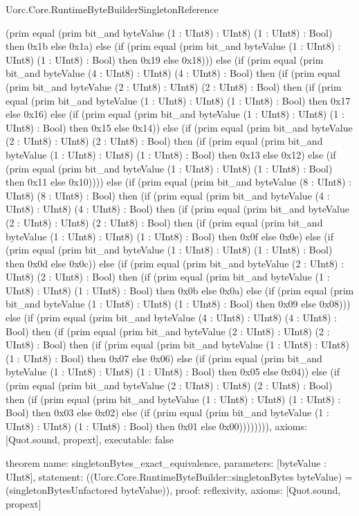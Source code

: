 \begin{lexlean}{Uorc.Core.RuntimeByteBuilderSingletonReference}
\begin{semanticmodule}
{(prim equal (prim bit_and byteValue (1 : UInt8) : UInt8) (1 : UInt8) : Bool) then 0x1b else 0x1a) else (if (prim equal (prim bit_and byteValue (1 : UInt8) : UInt8) (1 : UInt8) : Bool) then 0x19 else 0x18))) else (if (prim equal (prim bit_and byteValue (4 : UInt8) : UInt8) (4 : UInt8) : Bool) then (if (prim equal (prim bit_and byteValue (2 : UInt8) : UInt8) (2 : UInt8) : Bool) then (if (prim equal (prim bit_and byteValue (1 : UInt8) : UInt8) (1 : UInt8) : Bool) then 0x17 else 0x16) else (if (prim equal (prim bit_and byteValue (1 : UInt8) : UInt8) (1 : UInt8) : Bool) then 0x15 else 0x14)) else (if (prim equal (prim bit_and byteValue (2 : UInt8) : UInt8) (2 : UInt8) : Bool) then (if (prim equal (prim bit_and byteValue (1 : UInt8) : UInt8) (1 : UInt8) : Bool) then 0x13 else 0x12) else (if (prim equal (prim bit_and byteValue (1 : UInt8) : UInt8) (1 : UInt8) : Bool) then 0x11 else 0x10)))) else (if (prim equal (prim bit_and byteValue (8 : UInt8) : UInt8) (8 : UInt8) : Bool) then (if (prim equal (prim bit_and byteValue (4 : UInt8) : UInt8) (4 : UInt8) : Bool) then (if (prim equal (prim bit_and byteValue (2 : UInt8) : UInt8) (2 : UInt8) : Bool) then (if (prim equal (prim bit_and byteValue (1 : UInt8) : UInt8) (1 : UInt8) : Bool) then 0x0f else 0x0e) else (if (prim equal (prim bit_and byteValue (1 : UInt8) : UInt8) (1 : UInt8) : Bool) then 0x0d else 0x0c)) else (if (prim equal (prim bit_and byteValue (2 : UInt8) : UInt8) (2 : UInt8) : Bool) then (if (prim equal (prim bit_and byteValue (1 : UInt8) : UInt8) (1 : UInt8) : Bool) then 0x0b else 0x0a) else (if (prim equal (prim bit_and byteValue (1 : UInt8) : UInt8) (1 : UInt8) : Bool) then 0x09 else 0x08))) else (if (prim equal (prim bit_and byteValue (4 : UInt8) : UInt8) (4 : UInt8) : Bool) then (if (prim equal (prim bit_and byteValue (2 : UInt8) : UInt8) (2 : UInt8) : Bool) then (if (prim equal (prim bit_and byteValue (1 : UInt8) : UInt8) (1 : UInt8) : Bool) then 0x07 else 0x06) else (if (prim equal (prim bit_and byteValue (1 : UInt8) : UInt8) (1 : UInt8) : Bool) then 0x05 else 0x04)) else (if (prim equal (prim bit_and byteValue (2 : UInt8) : UInt8) (2 : UInt8) : Bool) then (if (prim equal (prim bit_and byteValue (1 : UInt8) : UInt8) (1 : UInt8) : Bool) then 0x03 else 0x02) else (if (prim equal (prim bit_and byteValue (1 : UInt8) : UInt8) (1 : UInt8) : Bool) then 0x01 else 0x00)))))))),
  axioms: [Quot.sound, propext],
  executable: false
}

theorem{
  name: singletonBytes_exact_equivalence,
  parameters: [byteValue : UInt8],
  statement: ((Uorc.Core.RuntimeByteBuilder::singletonBytes byteValue) = (singletonBytesUnfactored byteValue)),
  proof: reflexivity{},
  axioms: [Quot.sound, propext]
}
\end{semanticmodule}
\end{lexlean}
